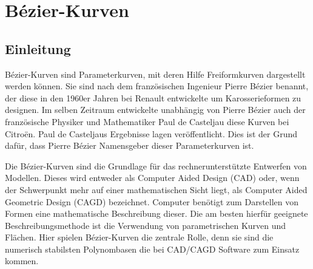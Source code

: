 %
%

\chapter{Bézier-Kurven}

\section{Einleitung}

Bézier-Kurven sind Parameterkurven, mit deren Hilfe Freiformkurven dargestellt werden können. Sie sind nach dem französischen Ingenieur Pierre Bézier benannt, der diese in den 1960er Jahren 
bei Renault entwickelte um Karosserieformen zu designen. Im selben Zeitraum entwickelte unabhängig von Pierre Bézier auch der französische Physiker und Mathematiker Paul de Casteljau diese Kurven bei Citroën. Paul de Casteljaus Ergebnisse lagen  veröffentlicht. Dies ist der Grund dafür, dass Pierre Bézier Namensgeber dieser Parameterkurven ist.\cite{Farin:2002}

\bigskip


Die Bézier-Kurven sind die Grundlage für das rechnerunterstützte Entwerfen von Modellen. Dieses wird entweder als Computer Aided Design (CAD) oder, wenn der Schwerpunkt mehr auf einer mathematischen Sicht liegt, als Computer Aided Geometric Design (CAGD) bezeichnet. \cite{Babovsky:2011} Computer benötigt zum Darstellen von Formen eine mathematische Beschreibung dieser. Die am besten hierfür geeignete Beschreibungsmethode ist die Verwendung von parametrischen Kurven und Flächen. Hier spielen Bézier-Kurven die zentrale Rolle, denn sie sind die numerisch stabilsten Polynombasen die bei CAD/CAGD Software zum Einsatz kommen.\cite{Farin:2002}

\bigskip


